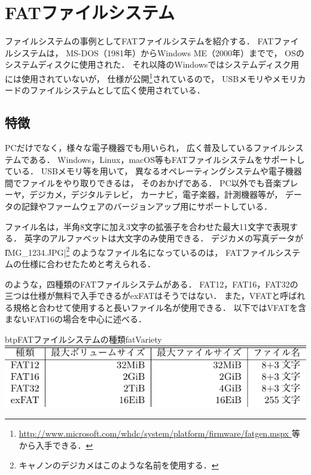 \chapter{FATファイルシステム}
\label{fatFs}
ファイルシステムの事例としてFATファイルシステムを紹介する．
FATファイルシステムは，
MS-DOS（1981年）からWindows ME（2000年）までで，
OSのシステムディスクに使用された．
それ以降のWindowsではシステムディスク用には使用されていないが，
仕様が公開\footnote{
  \url{http://www.microsoft.com/whdc/system/platform/firmware/fatgen.mspx
  }等から入手できる．}されているので，
USBメモリやメモリカードのファイルシステムとして広く使用されている．

\section{特徴}
PCだけでなく，様々な電子機器でも用いられ，
広く普及しているファイルシステムである．
Windows，Linux，macOS等もFATファイルシステムをサポートしている．
USBメモリ等を用いて，
異なるオペレーティングシステムや電子機器間でファイルをやり取りできるは，
そのおかげである．
PC以外でも音楽プレーヤ，デジカメ，デジタルテレビ，
カーナビ，電子楽器，計測機器等が，
データの記録やファームウェアのバージョンアップ用にサポートしている．

ファイル名は，半角8文字に加え3文字の拡張子を合わせた最大11文字で表現する．
英字のアルファベットは大文字のみ使用できる．
デジカメの写真データが\|IMG_1234.JPG|\footnote{
  キャノンのデジカメはこのような名前を使用する．}
のようなファイル名になっているのは，
FATファイルシステムの仕様に合わせたためと考えられる．

のような，四種類のFATファイルシステムがある．
FAT12，FAT16，FAT32の三つは仕様が無料で入手できるがexFATはそうではない．
また，VFATと呼ばれる規格と合わせて使用すると長いファイル名が使用できる．
以下ではVFATを含まないFAT16の場合を中心に述べる．

\begin{mytable}{btp}{FATファイルシステムの種類}{fatVariety}
  \includegraphics[scale=1.0]{Tbl/fatVariety.pdf}
\end{mytable}

